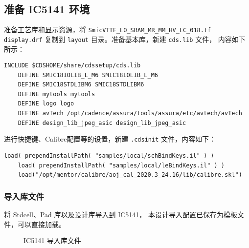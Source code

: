 \documentclass[12pt,hyperref,a4paper,UTF8]{ctexart}
\begin{document}
\subsection{准备 IC5141 环境}
准备工艺库和显示资源，将 \texttt{SmicVTTF\_LO\_SRAM\_MR\_MM\_HV\_LC\_018.tf
display.drf} 复制到 \texttt{layout} 目录。准备基本库，新建 \texttt{cds.lib} 文件，
内容如下所示：
\begin{lstlisting}[style=calibrestyle]
    INCLUDE $CDSHOME/share/cdssetup/cds.lib
    DEFINE SMIC18IOLIB_L_M6 SMIC18IOLIB_L_M6
    DEFINE SMIC18STDLIBM6 SMIC18STDLIBM6
    DEFINE mytools mytools
    DEFINE logo logo
    DEFINE avTech /opt/cadence/assura/tools/assura/etc/avtech/avTech
    DEFINE design_lib_jpeg_asic design_lib_jpeg_asic
\end{lstlisting}

进行快捷键、Calibre配置等的设置，新建 \texttt{.cdsinit} 文件，内容如下：
\begin{lstlisting}[style=calibrestyle]
    load( prependInstallPath( "samples/local/schBindKeys.il" ) )
    load( prependInstallPath( "samples/local/leBindKeys.il" ) )
    load("/opt/mentor/calibre/aoj_cal_2020.3_24.16/lib/calibre.skl")
\end{lstlisting}

\subsubsection{导入库文件}
将 Stdcell、Pad 库以及设计库导入到 IC5141，
本设计导入配置已保存为模板文件，可以直接加载。

\begin{figure}[htbp]
    \centering
    \caption{IC5141 导入库文件}
    \label{ic5141stream}
\end{figure}
\end{document}
